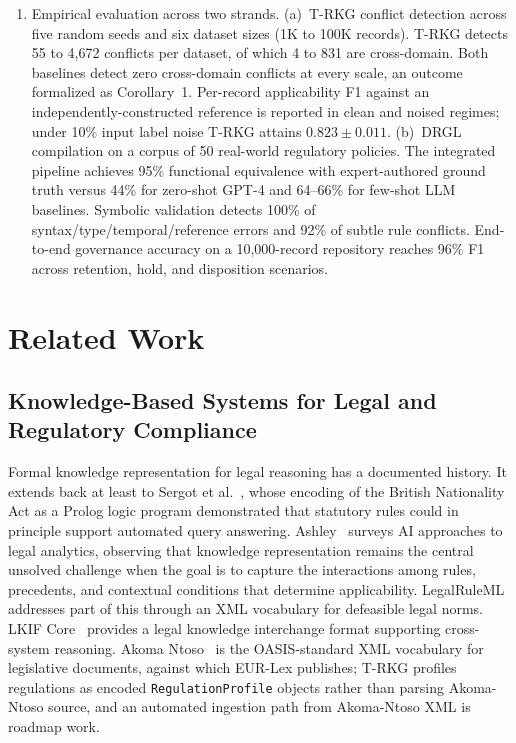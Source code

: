 \documentclass{ieeeaccess}
\begin{document}
\begin{enumerate}
    \item Empirical evaluation across two strands. (a)~T-RKG conflict detection across five random seeds and six dataset sizes (1K to 100K records). T-RKG detects 55 to 4{,}672 conflicts per dataset, of which 4 to 831 are cross-domain. Both baselines detect zero cross-domain conflicts at every scale, an outcome formalized as Corollary~1. Per-record applicability F1 against an independently-constructed reference is reported in clean and noised regimes; under 10\% input label noise T-RKG attains $0.823 \pm 0.011$. (b)~DRGL compilation on a corpus of 50 real-world regulatory policies. The integrated pipeline achieves 95\% functional equivalence with expert-authored ground truth versus 44\% for zero-shot GPT-4 and 64--66\% for few-shot LLM baselines. Symbolic validation detects 100\% of syntax/type/temporal/reference errors and 92\% of subtle rule conflicts. End-to-end governance accuracy on a 10{,}000-record repository reaches 96\% F1 across retention, hold, and disposition scenarios.
\end{enumerate}

\section{Related Work}

\subsection{Knowledge-Based Systems for Legal and Regulatory Compliance}

Formal knowledge representation for legal reasoning has a documented history. It extends back at least to Sergot et al.~\cite{sergot1986}, whose encoding of the British Nationality Act as a Prolog logic program demonstrated that statutory rules could in principle support automated query answering. Ashley~\cite{ashley2017} surveys AI approaches to legal analytics, observing that knowledge representation remains the central unsolved challenge when the goal is to capture the interactions among rules, precedents, and contextual conditions that determine applicability. LegalRuleML~\cite{legalruleml} addresses part of this through an XML vocabulary for defeasible legal norms. LKIF Core~\cite{lkif} provides a legal knowledge interchange format supporting cross-system reasoning. Akoma Ntoso~\cite{akomantoso} is the OASIS-standard XML vocabulary for legislative documents, against which EUR-Lex publishes; T-RKG profiles regulations as encoded \texttt{RegulationProfile} objects rather than parsing Akoma-Ntoso source, and an automated ingestion path from Akoma-Ntoso XML is roadmap work.
\end{document}

